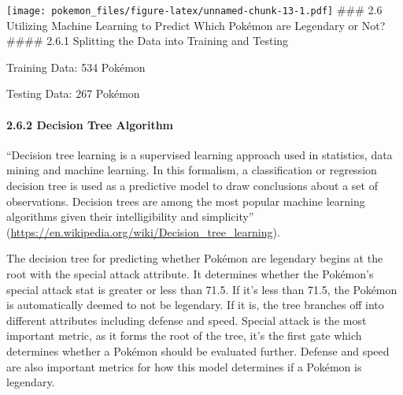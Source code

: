 \documentclass[
]{article}
\newenvironment{Shaded}{\begin{snugshade}}{\end{snugshade}}
\newcommand{\DecValTok}[1]{\textcolor[rgb]{0.00,0.00,0.81}{#1}}
\newcommand{\FunctionTok}[1]{\textcolor[rgb]{0.13,0.29,0.53}{\textbf{#1}}}
\newcommand{\NormalTok}[1]{#1}
\newcommand{\OtherTok}[1]{\textcolor[rgb]{0.56,0.35,0.01}{#1}}
\newcommand{\SpecialCharTok}[1]{\textcolor[rgb]{0.81,0.36,0.00}{\textbf{#1}}}
\begin{document}
\texttt{[image: pokemon\_files/figure-latex/unnamed-chunk-13-1.pdf]}
\#\#\# 2.6 Utilizing Machine Learning to Predict Which Pokémon are
Legendary or Not? \#\#\#\# 2.6.1 Splitting the Data into Training and
Testing

Training Data: 534 Pokémon

Testing Data: 267 Pokémon

\begin{Shaded}
\end{Shaded}

\paragraph{2.6.2 Decision Tree Algorithm}\label{decision-tree-algorithm}

``Decision tree learning is a supervised learning approach used in
statistics, data mining and machine learning. In this formalism, a
classification or regression decision tree is used as a predictive model
to draw conclusions about a set of observations. Decision trees are
among the most popular machine learning algorithms given their
intelligibility and simplicity''
(\url{https://en.wikipedia.org/wiki/Decision_tree_learning}).

The decision tree for predicting whether Pokémon are legendary begins at
the root with the special attack attribute. It determines whether the
Pokémon's special attack stat is greater or less than 71.5. If it's less
than 71.5, the Pokémon is automatically deemed to not be legendary. If
it is, the tree branches off into different attributes including defense
and speed. Special attack is the most important metric, as it forms the
root of the tree, it's the first gate which determines whether a Pokémon
should be evaluated further. Defense and speed are also important
metrics for how this model determines if a Pokémon is legendary.
\end{document}
